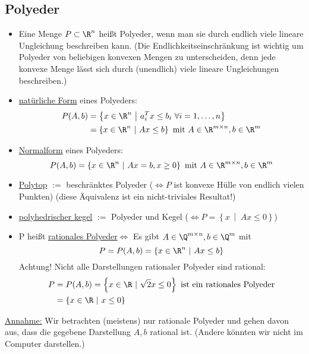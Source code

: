 \subsection{Polyeder}
\begin{definition}
	\begin{itemize}
    \item Eine Menge $P\subset \R^n$ heißt Polyeder, wenn man sie durch endlich viele lineare Ungleichung beschreiben kann.
      (Die Endlichkeitseinschränkung ist wichtig um Polyeder von beliebigen konvexen Mengen zu unterscheiden, denn jede konvexe Menge lässt sich durch (unendlich) viele lineare Ungleichungen beschreiben.)
		\item \underline{natürliche Form} eines Polyeders:
			\begin{align*}
				P(A,b) &= \left\{ x \in \R^n \ \middle| \ a^{T}_{i} x \leq b_{i} \ \forall i =1,\dots ,n \right\}\\
					   &= \left\{ x \in \R^n \ |\ Ax \leq b \right\} \text{ mit } A \in\R^{m\times n}, b\in \R^m
			\end{align*}
		\item \underline{Normalform} eines Polyeders:
			\begin{equation*}
				P(A,b) = \left\{ x \in \R^n \ | \ Ax = b, x\geq 0 \right\} \text{ mit } A \in\R^{m\times n}, b\in \R^m
			\end{equation*}
    \item \underline{Polytop} $:=$ beschränktes Polyeder ($\iff P$ ist konvexe Hülle von endlich vielen Punkten) (diese Äquivalenz ist ein nicht-triviales Resultat!)
		\item \underline{polyhedrischer kegel} $:=$ Polyeder und Kegel ($\iff P = \left\{x \ \middle| \ Ax \leq 0 \right\}$)
		\item P heißt \underline{rationales Polyeder}$\iff$ Es gibt $A\in\Q^{m \times n}, b \in \Q^m$ mit
			\begin{equation*}
				P = P(A,b) = \left\{ x \in \R^n\ | \ Ax \leq b \right\}
			\end{equation*}
			Achtung! Nicht alle Darstellungen rationaler Polyeder sind rational:
			\begin{align*}
				P &= P(A,b) = \left\{ x \in \R\ | \ \sqrt{2}x \leq 0 \right\} \text{ ist ein rationales Polyeder}\\
				  &= \left\{x \in \R \ | \ x \leq 0  \right\}
			\end{align*}
	\end{itemize}
\end{definition}
\underline{Annahme:} Wir betrachten (meistens) nur rationale Polyeder und gehen davon aus, dass die gegebene Darstellung $A,b$ rational ist. (Andere könnten wir nicht im Computer darstellen.)

